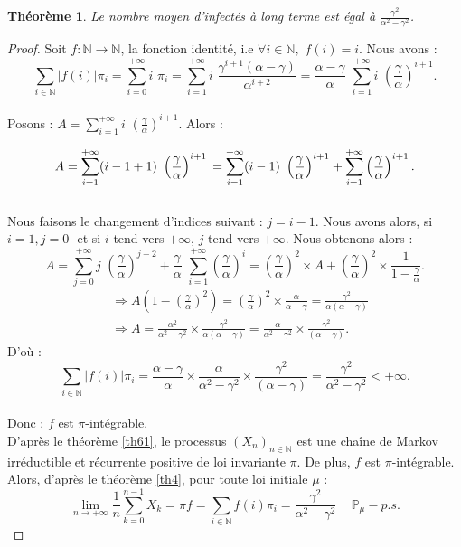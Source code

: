 \documentclass[12pt,a4paper]{report}
\newtheorem{thm}{Théorème}[section]
\theoremstyle{remark}
\begin{document}
\begin{thm}
Le nombre moyen d'infectés à long terme est égal à $\frac{\gamma^2}{\alpha^2-\gamma^2}$.
\end{thm}
\begin{proof}
Soit $f : \mathbb{N} \longrightarrow \mathbb{N}$, la fonction identité, i.e $\forall i \in \mathbb{N}, \, \, f(i) = i$. Nous avons :
$$\sum\limits_{i \in \mathbb{N}} |f(i)| \pi_i = \sum\limits_{i = 0}^{+\infty} i \, \, \pi_i = \sum\limits_{i = 1}^{+\infty} i \, \, \frac{\gamma^{i+1}(\alpha - \gamma)}{\alpha^{i+2}} = \frac{\alpha - \gamma}{\alpha} \, \, \sum\limits_{i = 1}^{+\infty} i \, \, \left(\frac{\gamma}{\alpha}\right)^{i+1}.$$
\\
Posons : $A = \sum\limits_{i = 1}^{+\infty} i \, \, \left(\frac{\gamma}{\alpha}\right)^{i+1}$. Alors :

$$A = \sum\limits_{i = 1}^{+\infty} (i - 1 + 1) \, \, \left(\frac{\gamma}{\alpha}\right)^{i+1} \\
= \sum\limits_{i = 1}^{+\infty} (i - 1) \, \, \left(\frac{\gamma}{\alpha}\right)^{i+1} + \sum\limits_{i = 1}^{+\infty}  \left(\frac{\gamma}{\alpha}\right)^{i+1}.$$
\\
Nous faisons le changement d'indices suivant : $j = i - 1$. Nous avons alors, si $i=1, j=0 \, \,$ et si $i$ tend vers $+\infty$, $j$ tend vers $+ \infty$. Nous obtenons alors :
\\
$$A = \sum\limits_{j = 0}^{+\infty} j \, \, \left(\frac{\gamma}{\alpha}\right)^{j+2} + \frac{\gamma}{\alpha} \, \, \sum\limits_{i = 1}^{+\infty}  \left(\frac{\gamma}{\alpha}\right)^{i} = \left(\frac{\gamma}{\alpha}\right)^2 \times A + \left(\frac{\gamma}{\alpha}\right)^2 \times \frac{1}{1 - \frac{\gamma}{\alpha}}.$$
\begin{align*}
&\Rightarrow A\left(1-\left(\frac{\gamma}{\alpha}\right)^2\right) = \left(\frac{\gamma}{\alpha}\right)^2 \times \frac{\alpha}{\alpha-\gamma} = \frac{\gamma^2}{\alpha\left(\alpha-\gamma\right)}\\
&\Rightarrow A = \frac{\alpha^2}{\alpha^2-\gamma^2}\times \frac{\gamma^2}{\alpha\left(\alpha-\gamma\right)}=\frac{\alpha}{\alpha^2-\gamma^2}\times \frac{\gamma^2}{\left(\alpha-\gamma\right)}.
\end{align*}
D'où :
$$\sum\limits_{i \in \mathbb{N}} |f(i)| \pi_i =\frac{\alpha-\gamma }{\alpha} \times \frac{\alpha}{\alpha^2-\gamma^2}\times \frac{\gamma^2}{\left(\alpha-\gamma\right)} = \frac{\gamma^2}{\alpha^2-\gamma^2}< +\infty .$$
\\
Donc : $f$ est $\pi$-intégrable.\\

D'après le théorème \ref{th61}, le processus $(X_n)_{n\in\mathbb{N}}$ est une chaîne de Markov irréductible et récurrente positive de loi invariante $\pi$. De plus, $f$ est $\pi$-intégrable. Alors, d'après le théorème \ref{th4}, pour toute loi initiale $\mu$ :
$$\lim\limits_{n \to +\infty} \frac{1}{n} \sum\limits_{k=0}^{n-1} X_k= \pi f = \sum\limits_{i\in\mathbb{N}} f(i)\pi_i= \frac{\gamma^2}{\alpha^2-\gamma^2} \text{   }\, \, \, \mathbb{P}_{\mu}-p.s.$$
\end{proof}
\end{document}
